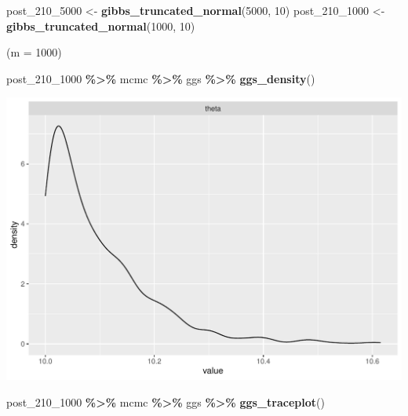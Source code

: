 \documentclass[
]{article}
\newenvironment{Shaded}{\begin{snugshade}}{\end{snugshade}}
\newcommand{\DecValTok}[1]{\textcolor[rgb]{0.00,0.00,0.81}{#1}}
\newcommand{\FunctionTok}[1]{\textcolor[rgb]{0.13,0.29,0.53}{\textbf{#1}}}
\newcommand{\NormalTok}[1]{#1}
\newcommand{\OtherTok}[1]{\textcolor[rgb]{0.56,0.35,0.01}{#1}}
\newcommand{\SpecialCharTok}[1]{\textcolor[rgb]{0.81,0.36,0.00}{\textbf{#1}}}
\begin{document}
\begin{Shaded}
\begin{Highlighting}[]
\NormalTok{post\_210\_5000 }\OtherTok{\textless{}{-}} \FunctionTok{gibbs\_truncated\_normal}\NormalTok{(}\DecValTok{5000}\NormalTok{, }\DecValTok{10}\NormalTok{)}
\NormalTok{post\_210\_1000 }\OtherTok{\textless{}{-}} \FunctionTok{gibbs\_truncated\_normal}\NormalTok{(}\DecValTok{1000}\NormalTok{, }\DecValTok{10}\NormalTok{)}
\end{Highlighting}
\end{Shaded}

(m = 1000)

\begin{Shaded}
\begin{Highlighting}[]
\NormalTok{post\_210\_1000 }\SpecialCharTok{\%\textgreater{}\%}\NormalTok{ mcmc }\SpecialCharTok{\%\textgreater{}\%}\NormalTok{ ggs }\SpecialCharTok{\%\textgreater{}\%} \FunctionTok{ggs\_density}\NormalTok{()}
\end{Highlighting}
\end{Shaded}

\begin{center}\includegraphics[width=0.8\linewidth]{Bayes_stat_hw3_files/figure-latex/unnamed-chunk-38-1} \end{center}

\begin{Shaded}
\begin{Highlighting}[]
\NormalTok{post\_210\_1000 }\SpecialCharTok{\%\textgreater{}\%}\NormalTok{ mcmc }\SpecialCharTok{\%\textgreater{}\%}\NormalTok{ ggs }\SpecialCharTok{\%\textgreater{}\%} \FunctionTok{ggs\_traceplot}\NormalTok{()}
\end{Highlighting}
\end{Shaded}
\end{document}
